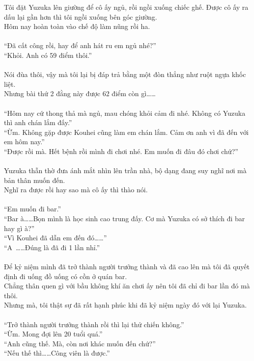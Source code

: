 \documentclass[12pt,a4paper, twosides]{book}
\begin{document}
Tôi đặt Yuzuka lên giường để cô ấy ngủ, rồi ngồi xuống chiếc ghế. Được cô ấy ra dấu lại gần hơn thì tôi ngồi xuống bên góc giường.\\
Hôm nay hoàn toàn vào chế độ làm nũng rồi ha.\\
\\
“Đã cất công rồi, hay để anh hát ru em ngủ nhé?”\\
“Khỏi. Anh có 59 điểm thôi.”\\
\\
Nói đùa thôi, vậy mà tôi lại bị đáp trả bằng một đòn thẳng như ruột ngựa khốc liệt.\\
Nhưng bài thứ 2 đằng này được 62 điểm còn gì……\\
\\
“Hôm nay cứ thong thả mà ngủ, mau chóng khỏi cảm đi nhé. Không có Yuzuka thì anh chán lắm đấy.”\\
“Ừm. Không gặp được Kouhei cũng làm em chán lắm. Cảm ơn anh vì đã đến với em hôm nay.”\\
“Được rồi mà. Hết bệnh rồi mình đi chơi nhé. Em muốn đi đâu đó chơi chứ?”\\
\\
Yuzuka thẫn thờ đưa ánh mắt nhìn lên trần nhà, bộ dạng đang suy nghĩ nơi mà bản thân muốn đến.\\
Nghĩ ra được rồi hay sao mà cô ấy thì thào nói.\\
\\
“Em muốn đi bar.”\\
“Bar à……Bọn mình là học sinh cao trung đấy. Cơ mà Yuzuka có sở thích đi bar hay gì à?”\\
“Vì Kouhei đã dẫn em đến đó……”\\
“A~……Đúng là đã đi 1 lần nhỉ.”\\
\\
Để kỷ niệm mình đã trở thành người trưởng thành và đã cao lên mà tôi đã quyết định đi uống đồ uống có cồn ở quán bar.\\
Chẳng thân quen gì với bầu không khí ăn chơi ấy nên tôi đã chỉ đi bar lần đó mà thôi.\\
Nhưng mà, tôi thật sự đã rất hạnh phúc khi đã kỷ niệm ngày đó với lại Yuzuka.\\
\\
“Trở thành người trưởng thành rồi thì lại thử chiến không.”\\
“Ừm. Mong đợi lên 20 tuổi quá.”\\
“Anh cũng thế. Mà, còn nơi khác muốn đến chứ?”\\
“Nếu thế thì……Công viên là được.”\\
\end{document}
